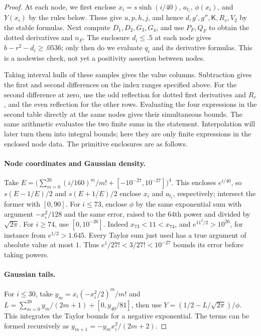 \begin{proof}
At each node, we first enclose \(x_i=s\sinh(i/40)\), \(a_{t_i}\),
\(\phi(x_i)\), and \(Y(x_i)\) by the rules below. These give
\(u,p,h,j\), and hence \(d,g',g'',\mathsf K,R_v,V_2\) by the stable
formulas. Next compute \(D_1,D_2,G_3,G_4\), and use \(P_F,Q_F\) to
obtain the dotted derivatives and \(n_F\). The enclosure \(d_i\le.5\)
at each node gives \(b-r^2-d_i\ge.0536\); only then do we evaluate
\(q_i\) and its derivative formulas. This is a nodewise check, not
yet a positivity assertion between nodes.

Taking interval hulls of these samples gives the value columns.
Subtraction gives the first and second differences on the index ranges
specified above. For the second difference at zero, use the odd
reflection for dotted first derivatives and \(R_v\), and the even
reflection for the other rows. Evaluating the four expressions in the
second table directly at the same nodes gives their simultaneous bounds.
The same arithmetic evaluates the two finite sums in the statement.
Interpolation will later turn them into integral bounds; here they
are only finite expressions in the enclosed node data. The primitive
enclosures are as follows.

\paragraph{Node coordinates and Gaussian density.}
Take
\(E=\big(\sum_{m=0}^{26}(i/160)^m/m!+[-10^{-27},10^{-27}]\big)^4\).
This encloses \(e^{i/40}\), so \(s(E-1/E)/2\) and \(s(E+1/E)/2\)
enclose \(x_i\) and \(a_{t_i}\), respectively; intersect the former
with \([0,90]\). For \(i\le73\), enclose \(\phi\) by the same
exponential sum with argument \(-x_i^2/128\) and the same error,
raised to the 64th power and divided by \(\sqrt{2\pi}\).
For \(i\ge74\), use \([0,10^{-26}]\). Indeed
\(x_{73}<11<x_{74}\), and \(e^{11^2/2}>10^{26}\), for instance from
\(e^{1/2}>1.645\). Every Taylor sum just used has a true argument
of absolute value at most \(1\). Thus
\(e^1/27!<3/27!<10^{-27}\) bounds its error before taking powers.

\paragraph{Gaussian tails.}
For \(i\le30\), take \(y_m=x_i(-x_i^2/2)^m/m!\) and
\(L=\sum_{m=0}^{39}y_m/(2m+1)+[0,y_{40}/81]\), then use
\(Y=(1/2-L/\sqrt{2\pi})/\phi\). This integrates the Taylor bounds
for a negative exponential. The terms can be formed recursively as
\(y_{m+1}=-y_m x_i^2/(2m+2)\).


\end{proof}
